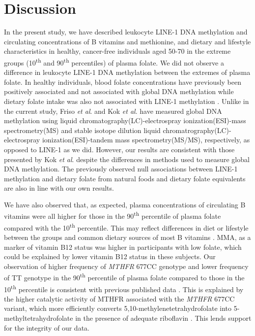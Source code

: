 \section[]{Discussion} %
\noindent In the present study, we have described leukocyte LINE-1 DNA methylation and circulating concentrations of B vitamins and methionine, and dietary and lifestyle characteristics in healthy, cancer-free individuals aged 50-70 in the extreme groups (10\textsuperscript{th} and 90\textsuperscript{th} percentiles) of plasma folate. We did not observe a difference in leukocyte LINE-1 DNA methylation between the extremes of plasma folate. In healthy individuals, blood folate concentrations have previously been positively associated \cite{c318} and not associated with global DNA methylation \cite{c319} while dietary folate intake was also not associated with LINE-1 methylation \cite{c317}. Unlike in the current study, Friso \emph{et al}. \cite{c318} and Kok \emph{et al}. \cite{c319} have measured global DNA methylation using liquid chromatography(LC)-electrospray ionization(ESI)-mass spectrometry(MS) and stable isotope dilution liquid chromatrography(LC)-electrospray ionization(ESI)-tandem mass spectrometry(MS/MS), respectively, as opposed to LINE-1 as we did. However, our results are consistent with those presented by Kok \emph{et al}. despite the differences in methods used to measure global DNA methylation. The previously observed null associations between LINE-1 methylation and dietary folate from natural foods and dietary folate equivalents \cite{c317} are also in line with our own results.

\noindent We have also observed that, as expected, plasma concentrations of circulating B vitamins were all higher for those in the 90\textsuperscript{th} percentile of plasma folate compared with the 10\textsuperscript{th} percentile. This may reflect differences in diet or lifestyle between the groups and common dietary sources of most B vitamins \cite{c329}. MMA, as a marker of vitamin B12 status \cite{c330} was higher in participants with low folate, which could be explained by lower vitamin B12 status in these subjects. Our observation of higher frequency of \emph{MTHFR} 677CC genotype and lower frequency of TT genotype in the 90\textsuperscript{th} percentile of plasma folate compared to those in the 10\textsuperscript{th} percentile is consistent with previous published data \cite{c318}. This is explained by the higher catalytic activity of MTHFR associated with the \emph{MTHFR} 677CC variant, which more efficiently converts 5,10-methylenetetrahydrofolate into 5-methyltetrahydrofolate in the presence of adequate riboflavin \cite{c318}. This lends support for the integrity of our data.

